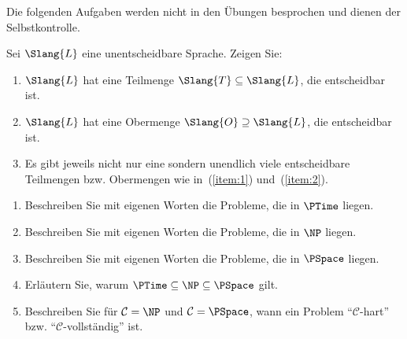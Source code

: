 \documentclass[german]{latteachCD}[2017/03/28]
\begin{document}
\maketitle

\begin{mdframed}
  Die folgenden Aufgaben werden nicht in den Übungen besprochen und dienen der
  Selbstkontrolle.

  \renewcommand{\theexercise}{\Alph{exercise}}
  \setcounter{exercise}{7}

  \begin{exercise}
    Sei $\Slang{L}$ eine unentscheidbare Sprache. Zeigen Sie:
    \begin{enumerate}
    \item\label{item:1} $\Slang{L}$ hat eine Teilmenge $\Slang{T}\subseteq \Slang{L}$, die
      entscheidbar ist.
    \item\label{item:2} $\Slang{L}$ hat eine Obermenge $\Slang{O}\supseteq
      \Slang{L}$, die entscheidbar ist.
    \item Es gibt jeweils nicht nur eine sondern unendlich viele entscheidbare
      Teilmengen bzw. Obermengen wie in~(\ref{item:1}) und~(\ref{item:2}).
    \end{enumerate}
  \end{exercise}

  \renewcommand{\theexercise}{\BoldGreek{exercise}}
  \setcounter{exercise}{0}

  \begin{exercise}
    \vspace*{-\baselineskip}
    \begin{enumerate}
    \item Beschreiben Sie mit eigenen Worten die Probleme, die in
      $\PTime$ liegen.
    \item Beschreiben Sie mit eigenen Worten die Probleme, die in
      $\NP$ liegen.
    \item Beschreiben Sie mit eigenen Worten die Probleme, die in $\PSpace$
      liegen.
    \item Erläutern Sie, warum $\PTime \subseteq \NP \subseteq \PSpace$ gilt.
    \item Beschreiben Sie für $\mathcal{C} = \NP$ und $\mathcal{C} = \PSpace$,
      wann ein Problem \enquote{$\mathcal{C}$-hart} bzw.\@
      \enquote{$\mathcal{C}$-vollständig} ist.
    \end{enumerate}
  \end{exercise}

\end{mdframed}
\end{document}
